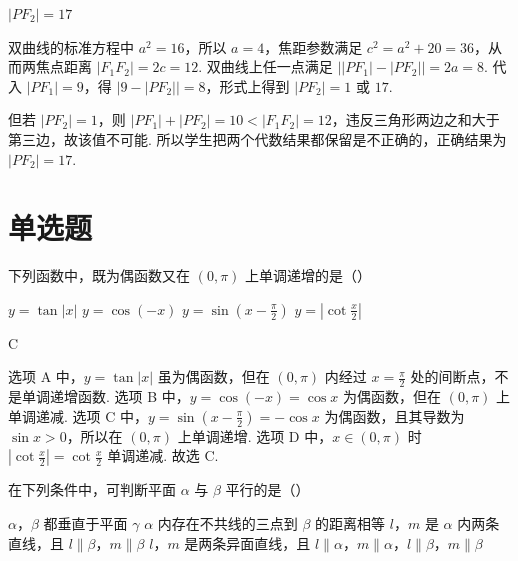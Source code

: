 \begin{answer}
\(\left|PF_{2}\right|=17\)
\end{answer}

\begin{solution}
双曲线的标准方程中 \(a^2=16\)，所以 \(a=4\)，焦距参数满足 \(c^2=a^2+20=36\)，从而两焦点距离 \(|F_1F_2|=2c=12\). 双曲线上任一点满足 \(\left||PF_1|-|PF_2|\right|=2a=8\). 代入 \(|PF_1|=9\)，得 \(|9-|PF_2||=8\)，形式上得到 \(|PF_2|=1\) 或 \(17\).

但若 \(|PF_2|=1\)，则 \(|PF_1|+|PF_2|=10<|F_1F_2|=12\)，违反三角形两边之和大于第三边，故该值不可能. 所以学生把两个代数结果都保留是不正确的，正确结果为 \(|PF_2|=17\).
\end{solution}

\section{单选题}
\begin{problem}
下列函数中，既为偶函数又在 \((0, \pi)\) 上单调递增的是（\quad）

\choices
    {\(y = \tan |x|\)}
    {\(y = \cos (-x)\)}
    {\( y = \sin \left(x - \frac{\pi}{2}\right) \)}
    {\(y = \left|\cot \frac{x}{2}\right|\)}
\end{problem}

\begin{answer}
C
\end{answer}

\begin{solution}
选项 A 中，\(y=\tan|x|\) 虽为偶函数，但在 \((0,\pi)\) 内经过 \(x=\frac{\pi}{2}\) 处的间断点，不是单调递增函数. 选项 B 中，\(y=\cos(-x)=\cos x\) 为偶函数，但在 \((0,\pi)\) 上单调递减. 选项 C 中，\(y=\sin\left(x-\frac{\pi}{2}\right)=-\cos x\) 为偶函数，且其导数为 \(\sin x>0\)，所以在 \((0,\pi)\) 上单调递增. 选项 D 中，\(x\in(0,\pi)\) 时 \(\left|\cot\frac{x}{2}\right|=\cot\frac{x}{2}\) 单调递减. 故选 C.
\end{solution}

\begin{problem}
在下列条件中，可判断平面 \(\alpha\) 与 \(\beta\) 平行的是（\quad）

\choices
    {\(\alpha\)，\(\beta\) 都垂直于平面 \(\gamma\)}
    {\(\alpha\) 内存在不共线的三点到 \(\beta\) 的距离相等}
    {\(l\)，\(m\) 是 \(\alpha\) 内两条直线，且 \(l \parallel \beta\)，\(m \parallel \beta\)}
    {\(l\)，\(m\) 是两条异面直线，且 \(l \parallel \alpha\)，\(m \parallel \alpha\)，\(l \parallel \beta\)，\(m \parallel \beta\)}
\end{problem}

